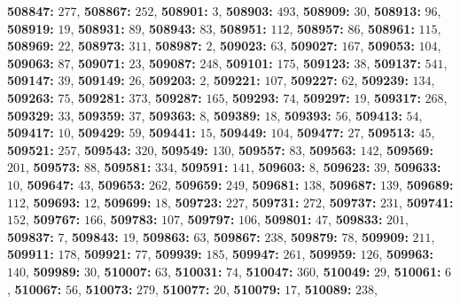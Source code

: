 \textsf{\bfseries 508847:} $277$, \textsf{\bfseries 508867:} $252$, \textsf{\bfseries 508901:} $3$, \textsf{\bfseries 508903:} $493$, \textsf{\bfseries 508909:} $30$, \textsf{\bfseries 508913:} $96$, \textsf{\bfseries 508919:} $19$, \textsf{\bfseries 508931:} $89$, \textsf{\bfseries 508943:} $83$, \textsf{\bfseries 508951:} $112$, \textsf{\bfseries 508957:} $86$, \textsf{\bfseries 508961:} $115$, \textsf{\bfseries 508969:} $22$, \textsf{\bfseries 508973:} $311$, \textsf{\bfseries 508987:} $2$, \textsf{\bfseries 509023:} $63$, \textsf{\bfseries 509027:} $167$, \textsf{\bfseries 509053:} $104$, \textsf{\bfseries 509063:} $87$, \textsf{\bfseries 509071:} $23$, \textsf{\bfseries 509087:} $248$, \textsf{\bfseries 509101:} $175$, \textsf{\bfseries 509123:} $38$, \textsf{\bfseries 509137:} $541$, \textsf{\bfseries 509147:} $39$, \textsf{\bfseries 509149:} $26$, \textsf{\bfseries 509203:} $2$, \textsf{\bfseries 509221:} $107$, \textsf{\bfseries 509227:} $62$, \textsf{\bfseries 509239:} $134$, \textsf{\bfseries 509263:} $75$, \textsf{\bfseries 509281:} $373$, \textsf{\bfseries 509287:} $165$, \textsf{\bfseries 509293:} $74$, \textsf{\bfseries 509297:} $19$, \textsf{\bfseries 509317:} $268$, \textsf{\bfseries 509329:} $33$, \textsf{\bfseries 509359:} $37$, \textsf{\bfseries 509363:} $8$, \textsf{\bfseries 509389:} $18$, \textsf{\bfseries 509393:} $56$, \textsf{\bfseries 509413:} $54$, \textsf{\bfseries 509417:} $10$, \textsf{\bfseries 509429:} $59$, \textsf{\bfseries 509441:} $15$, \textsf{\bfseries 509449:} $104$, \textsf{\bfseries 509477:} $27$, \textsf{\bfseries 509513:} $45$, \textsf{\bfseries 509521:} $257$, \textsf{\bfseries 509543:} $320$, \textsf{\bfseries 509549:} $130$, \textsf{\bfseries 509557:} $83$, \textsf{\bfseries 509563:} $142$, \textsf{\bfseries 509569:} $201$, \textsf{\bfseries 509573:} $88$, \textsf{\bfseries 509581:} $334$, \textsf{\bfseries 509591:} $141$, \textsf{\bfseries 509603:} $8$, \textsf{\bfseries 509623:} $39$, \textsf{\bfseries 509633:} $10$, \textsf{\bfseries 509647:} $43$, \textsf{\bfseries 509653:} $262$, \textsf{\bfseries 509659:} $249$, \textsf{\bfseries 509681:} $138$, \textsf{\bfseries 509687:} $139$, \textsf{\bfseries 509689:} $112$, \textsf{\bfseries 509693:} $12$, \textsf{\bfseries 509699:} $18$, \textsf{\bfseries 509723:} $227$, \textsf{\bfseries 509731:} $272$, \textsf{\bfseries 509737:} $231$, \textsf{\bfseries 509741:} $152$, \textsf{\bfseries 509767:} $166$, \textsf{\bfseries 509783:} $107$, \textsf{\bfseries 509797:} $106$, \textsf{\bfseries 509801:} $47$, \textsf{\bfseries 509833:} $201$, \textsf{\bfseries 509837:} $7$, \textsf{\bfseries 509843:} $19$, \textsf{\bfseries 509863:} $63$, \textsf{\bfseries 509867:} $238$, \textsf{\bfseries 509879:} $78$, \textsf{\bfseries 509909:} $211$, \textsf{\bfseries 509911:} $178$, \textsf{\bfseries 509921:} $77$, \textsf{\bfseries 509939:} $185$, \textsf{\bfseries 509947:} $261$, \textsf{\bfseries 509959:} $126$, \textsf{\bfseries 509963:} $140$, \textsf{\bfseries 509989:} $30$, \textsf{\bfseries 510007:} $63$, \textsf{\bfseries 510031:} $74$, \textsf{\bfseries 510047:} $360$, \textsf{\bfseries 510049:} $29$, \textsf{\bfseries 510061:} $6$, \textsf{\bfseries 510067:} $56$, \textsf{\bfseries 510073:} $279$, \textsf{\bfseries 510077:} $20$, \textsf{\bfseries 510079:} $17$, \textsf{\bfseries 510089:} $238$, 
